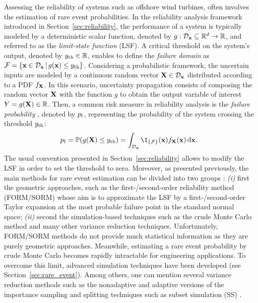 Assessing the reliability of systems such as offshore wind turbines, often involves the estimation of rare event probabilities. 
In the reliability analysis framework introduced in Section~\ref{sec:reliability}, the performance of a system is typically modeled by a deterministic scalar function, denoted by $g: \mathcal{D}_{\bf x} \subseteq \mathbb{R}^d \rightarrow \mathbb{R}$, and referred to as the \textit{limit-state function} (LSF). 
A critical threshold on the system's output, denoted by $y_\mathrm{th} \in \mathbb{R}$, enables to define the \textit{failure domain} as $\mathcal{F} = \{{\bf x} \in \mathcal{D}_{\bf x} \, | \,  g({\bf x}) \leq y_\mathrm{th}\}$. 
Considering a probabilistic framework, the uncertain inputs are modeled by a continuous random vector ${\bf X} \in \mathcal{D}_{\bf x}$ distributed according to a PDF $f_{\bf X}$. 
In this scenario, uncertainty propagation consists of composing the random vector ${\bf X}$ with the function $g$ to obtain the output variable of interest $Y = g({\bf X}) \in \mathbb{R}$. 
Then, a common risk measure in reliability analysis is the \textit{failure probability} \citep{rockafellar_2015}, denoted by $p_\mathrm{f}$, representing the probability of the system crossing the threshold $y_\mathrm{th}$:
\begin{equation}
    \label{eq:failure_proba_c6}
    \pf = \P(g(\bX) \leq \yth)
        = \int_{\iD_\bx} \1_{\{\iF\}}(\bx) f_\bX(\bx) \, \dd\bx.
\end{equation}
The usual convention presented in Section~\ref{sec:reliability} allows to modify the LSF in order to set the threshold to zero. 
Moreover, as presented previously, the main methods for rare event estimation can be divided into two groups \citep{MorioBalesdent2015}: 
\textit{(i)} first the geometric approaches, such as the first-/second-order reliability method (FORM/SORM) whose aim is to approximate the LSF by a first-/second-order Taylor expansion at the most probable failure point in the standard normal space; 
\textit{(ii)} second the simulation-based techniques such as the crude Monte Carlo method and many other variance reduction techniques. 
Unfortunately, FORM/SORM methods do not provide much statistical information as they are purely geometric approaches. 
Meanwhile, estimating a rare event probability by crude Monte Carlo becomes rapidly intractable for engineering applications. 
To overcome this limit, advanced simulation techniques have been developed (see Section~\ref{sec:rare_event}). 
Among others, one can mention several variance reduction methods such as the nonadaptive and adaptive versions of the importance sampling \citep{RubinsteinKroese1981} and splitting techniques \citep{cerou2012sequential} such as subset simulation (SS) \citep{AuBeck2001}.

